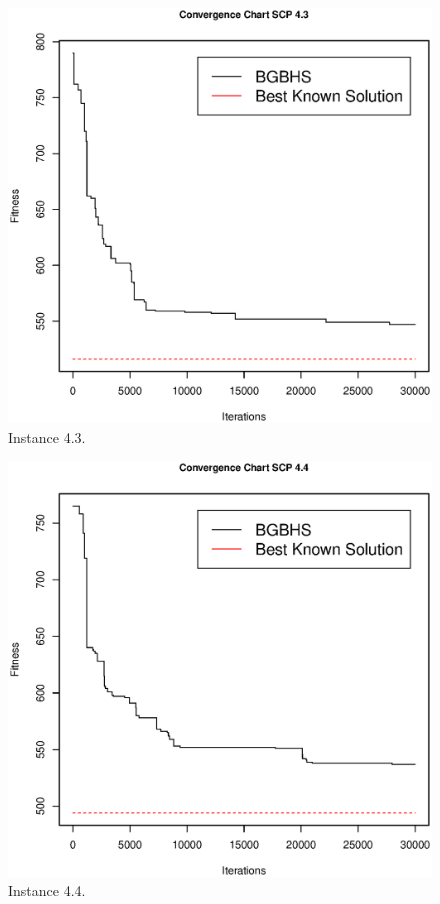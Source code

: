 \clearpage

\begin{figure}[]
\centering
\includegraphics[scale=.5]{Resultados/scp43.eps}
\caption{Instance 4.3.}
\label{fig:Instance.4.3}
\end{figure}

\begin{figure}[]
\centering
\includegraphics[scale=.45]{Resultados/scp44.eps}
\caption{Instance 4.4.}
\label{fig:Instance.4.4}
\end{figure}

